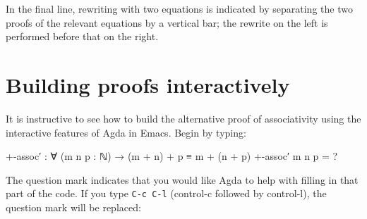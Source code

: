 \begin{fence}
\begin{code}
\AgdaSymbol{(}\AgdaSpace{}%
\AgdaSpace{}%
\AgdaSymbol{:}\AgdaSpace{}%
\AgdaSymbol{)}\AgdaSpace{}%
\AgdaSpace{}%
\AgdaSpace{}%
\AgdaOperator{\AgdaPrimitive{+}}\AgdaSpace{}%
\AgdaSpace{}%
\AgdaSpace{}%
\AgdaSpace{}%
\AgdaOperator{\AgdaPrimitive{+}}\AgdaSpace{}%
\<%
\\
\>[0]\AgdaSpace{}%
\AgdaSpace{}%
\AgdaSpace{}%
\AgdaSpace{}%
\AgdaSpace{}%
\AgdaSpace{}%
\AgdaSymbol{=}\AgdaSpace{}%
\<%
\\
\>[0]\AgdaSpace{}%
\AgdaSpace{}%
\AgdaSymbol{(}\AgdaSpace{}%
\AgdaSymbol{)}\AgdaSpace{}%
\AgdaSpace{}%
\AgdaSpace{}%
\AgdaSpace{}%
\AgdaSpace{}%
\AgdaSymbol{|}\AgdaSpace{}%
\AgdaSpace{}%
\AgdaSpace{}%
\AgdaSpace{}%
\AgdaSymbol{=}\AgdaSpace{}%
\<%
\end{code}
\end{fence}

In the final line, rewriting with two equations is indicated by
separating the two proofs of the relevant equations by a vertical bar;
the rewrite on the left is performed before that on the right.

\hypertarget{building-proofs-interactively}{%
\section{Building proofs
interactively}\label{building-proofs-interactively}}

It is instructive to see how to build the alternative proof of
associativity using the interactive features of Agda in Emacs. Begin by
typing:

\begin{myDisplay}
+-assoc′ : ∀ (m n p : ℕ) → (m + n) + p ≡ m + (n + p)
+-assoc′ m n p = ?
\end{myDisplay}

The question mark indicates that you would like Agda to help with
filling in that part of the code. If you type \texttt{C-c\ C-l}
(control-c followed by control-l), the question mark will be replaced:

